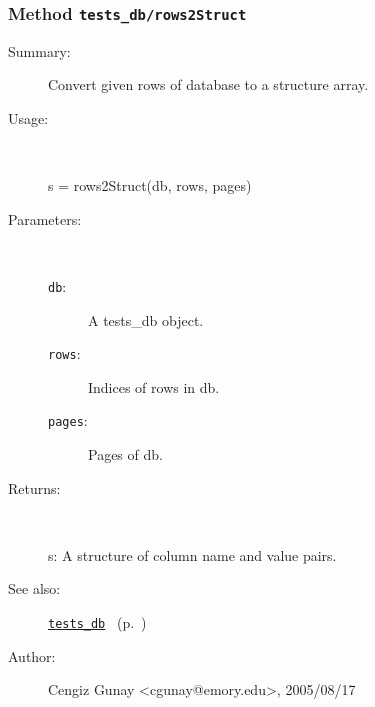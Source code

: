 \subsubsection[Method \texttt{rows2Struct}]{Method \texttt{tests\_db/rows2Struct}}%
%
\label{ref_tests_db__rows2Struct}%
\hypertarget{ref_tests_db__rows2Struct}{}%
\begin{description}
\item[Summary:]Convert given rows of database to a structure array.
%
\item[Usage:]~%
\begin{lyxcode}%
s = rows2Struct(db, rows, pages)
%
\end{lyxcode}%
%
%
\item[Parameters:]~
\begin{description}%
\item[\texttt{db}:]
 A tests\_db object.
\item[\texttt{rows}:]
 Indices of rows in db.
\item[\texttt{pages}:]
 Pages of db.
\end{description}%
%
\item[Returns:]~

	s: A structure of column name and value pairs.
%
%
\item[See also:]%
\hyperlink{ref_tests_db}{\texttt{tests\_db}}%
\ (p.~\pageref{ref_tests_db})%
%
%
\item[Author:]%
Cengiz Gunay <cgunay@emory.edu>, 2005/08/17%
\end{description}
\methodline%
